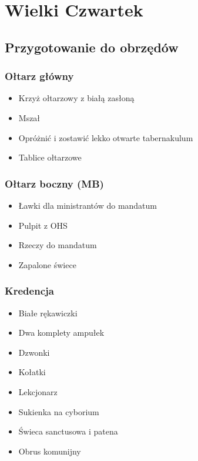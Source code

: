 \chapter{Wielki Czwartek }

\section{Przygotowanie do obrzędów}

\subsection{Ołtarz główny}

\begin{itemize}
    \item Krzyż ołtarzowy z białą zasłoną
    \item Mszał
    \item Opróżnić i zostawić lekko otwarte tabernakulum
    \item Tablice ołtarzowe
\end{itemize}

\subsection{Ołtarz boczny (MB)}

\begin{itemize}
    \item Ławki dla ministrantów do mandatum
    \item Pulpit z OHS
    \item Rzeczy do mandatum
    \item Zapalone świece
\end{itemize}

\subsection{Kredencja}

\begin{itemize}
    \item Białe rękawiczki
    \item Dwa komplety ampułek
    \item Dzwonki
    \item Kołatki
    \item Lekcjonarz
    \item Sukienka na cyborium
    \item Świeca sanctusowa i patena
    \item Obrus komunijny
\end{itemize}

